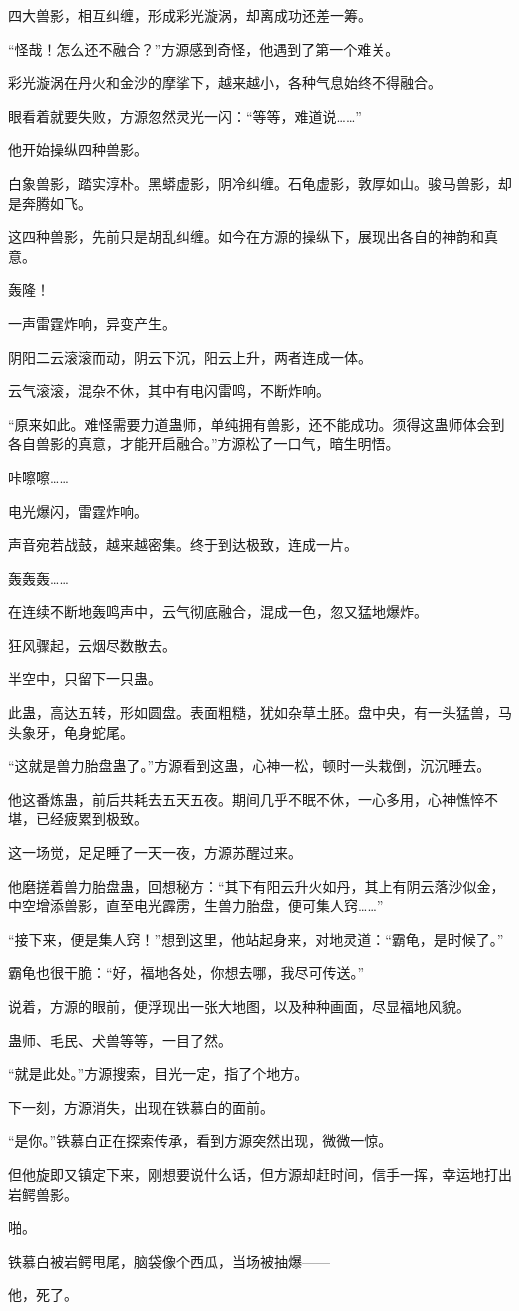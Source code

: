 \begin{this_body}
四大兽影，相互纠缠，形成彩光漩涡，却离成功还差一筹。

“怪哉！怎么还不融合？”方源感到奇怪，他遇到了第一个难关。

彩光漩涡在丹火和金沙的摩挲下，越来越小，各种气息始终不得融合。

眼看着就要失败，方源忽然灵光一闪：“等等，难道说……”

他开始操纵四种兽影。

白象兽影，踏实淳朴。黑蟒虚影，阴冷纠缠。石龟虚影，敦厚如山。骏马兽影，却是奔腾如飞。

这四种兽影，先前只是胡乱纠缠。如今在方源的操纵下，展现出各自的神韵和真意。

轰隆！

一声雷霆炸响，异变产生。

阴阳二云滚滚而动，阴云下沉，阳云上升，两者连成一体。

云气滚滚，混杂不休，其中有电闪雷鸣，不断炸响。

“原来如此。难怪需要力道蛊师，单纯拥有兽影，还不能成功。须得这蛊师体会到各自兽影的真意，才能开启融合。”方源松了一口气，暗生明悟。

咔嚓嚓……

电光爆闪，雷霆炸响。

声音宛若战鼓，越来越密集。终于到达极致，连成一片。

轰轰轰……

在连续不断地轰鸣声中，云气彻底融合，混成一色，忽又猛地爆炸。

狂风骤起，云烟尽数散去。

半空中，只留下一只蛊。

此蛊，高达五转，形如圆盘。表面粗糙，犹如杂草土胚。盘中央，有一头猛兽，马头象牙，龟身蛇尾。

“这就是兽力胎盘蛊了。”方源看到这蛊，心神一松，顿时一头栽倒，沉沉睡去。

他这番炼蛊，前后共耗去五天五夜。期间几乎不眠不休，一心多用，心神憔悴不堪，已经疲累到极致。

这一场觉，足足睡了一天一夜，方源苏醒过来。

他磨搓着兽力胎盘蛊，回想秘方：“其下有阳云升火如丹，其上有阴云落沙似金，中空增添兽影，直至电光霹雳，生兽力胎盘，便可集人窍……”

“接下来，便是集人窍！”想到这里，他站起身来，对地灵道：“霸龟，是时候了。”

霸龟也很干脆：“好，福地各处，你想去哪，我尽可传送。”

说着，方源的眼前，便浮现出一张大地图，以及种种画面，尽显福地风貌。

蛊师、毛民、犬兽等等，一目了然。

“就是此处。”方源搜索，目光一定，指了个地方。

下一刻，方源消失，出现在铁慕白的面前。

“是你。”铁慕白正在探索传承，看到方源突然出现，微微一惊。

但他旋即又镇定下来，刚想要说什么话，但方源却赶时间，信手一挥，幸运地打出岩鳄兽影。

啪。

铁慕白被岩鳄甩尾，脑袋像个西瓜，当场被抽爆——

他，死了。

\end{this_body}

